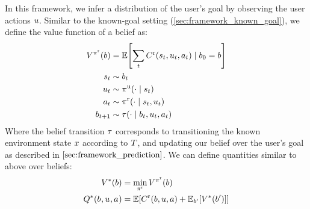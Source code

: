 In this framework, we infer a distribution of the user's goal by observing the user actions $u$. Similar to the known-goal setting (\cref{sec:framework_known_goal}), we define the value function of a belief as:
\begin{align*}
  V^{\pi^{\text{r}}}(b) &= \mathbb{E}\!\left[\sum_{t} C^{\text{r}}(s_t, u_t, a_t)  \mid b_0 = b\right] \\
  s_t &\sim b_t\\
  u_t &\sim \pi^{\text{u}}(\cdot \mid s_t)\\
  a_t &\sim \pi^{\text{r}}(\cdot \mid s_t, u_t)\\
  b_{t+1} &\sim \tau(\cdot \mid b_t, u_t, a_t)
\end{align*}
Where the belief transition $\tau$ corresponds to transitioning the known environment state $x$ according to $T$, and updating our belief over the user's goal as described in $\cref{sec:framework_prediction}$. We can define quantities similar to above over beliefs:
\begin{align}
  V^{*}(b) &= \min_{\pi^{\text{r}}} V^{\pi^{\text{r}}}(b) \label{eq:v_belief}\\
  Q^{*}(b_{ }, u_{ }, a_{ }) &= \mathbb{E}\!\left[C^{\text{r}}(b, u, a) + \mathbb{E}_{b'}\!\left[V^{*}(b')\right]\right] \nonumber
\end{align}







